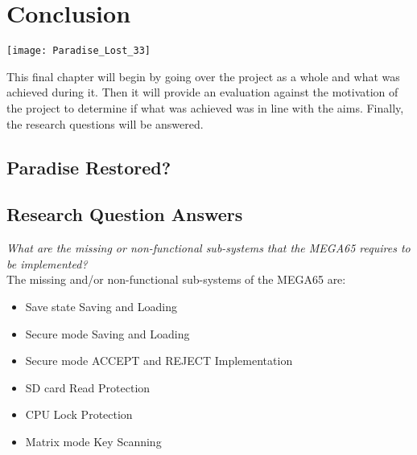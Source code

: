 
\chapter{Conclusion} %

\texttt{[image: Paradise\_Lost\_33]}

\label{Chapter 8} %

This final chapter will begin by going over the project as a whole and what was achieved during it. Then it will provide an evaluation against the motivation of the project to determine if what was achieved was in line with the aims. Finally, the research questions will be answered.


\section{Paradise Restored?}

\label{Ch8 Sec1}


\section{Research Question Answers}

\label{Ch9 Sec2}

\textit{What are the missing or non-functional sub-systems that the MEGA65 requires to be implemented?}\\
The missing and/or non-functional sub-systems of the MEGA65 are:
\begin{itemize}
\item{Save state Saving and Loading}
\item{Secure mode Saving and Loading}
\item{Secure mode ACCEPT and REJECT Implementation}
\item{SD card Read Protection}
\item{CPU Lock Protection}
\item{Matrix mode Key Scanning}
\end{itemize}

